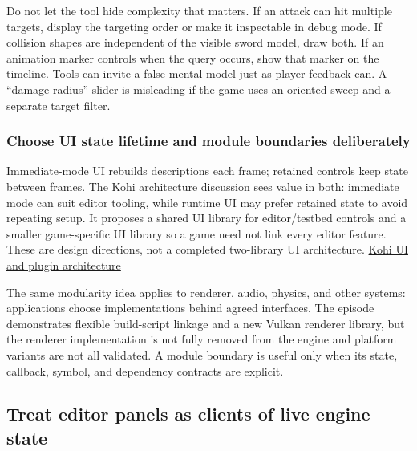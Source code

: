 Do not let the tool hide complexity that matters. If an attack can hit multiple targets, display the targeting order or make it inspectable in debug mode. If collision shapes are independent of the visible sword model, draw both. If an animation marker controls when the query occurs, show that marker on the timeline. Tools can invite a false mental model just as player feedback can. A ``damage radius'' slider is misleading if the game uses an oriented sweep and a separate target filter.

\subsubsection{Choose UI state lifetime and module boundaries deliberately}\label{06-engine-ii-ch032-choose-ui-state-lifetime-and-module-boundaries-deliberately}

\hypertarget{06-engine-ii-ch032-choose-ui-state-lifetime-and-module-boundaries-deliberately}{}

Immediate-mode UI rebuilds descriptions each frame; retained controls keep state between frames. The Kohi architecture discussion sees value in both: immediate mode can suit editor tooling, while runtime UI may prefer retained state to avoid repeating setup. It proposes a shared UI library for editor/testbed controls and a smaller game-specific UI library so a game need not link every editor feature. These are design directions, not a completed two-library UI architecture. \href{https://www.youtube.com/watch?v=6cn8Ip0IJsw}{Kohi UI and plugin architecture}

The same modularity idea applies to renderer, audio, physics, and other systems: applications choose implementations behind agreed interfaces. The episode demonstrates flexible build-script linkage and a new Vulkan renderer library, but the renderer implementation is not fully removed from the engine and platform variants are not all validated. A module boundary is useful only when its state, callback, symbol, and dependency contracts are explicit.

\subsection{Treat editor panels as clients of live engine state}\label{06-engine-ii-ch032-treat-editor-panels-as-clients-of-live-engine-state}

\hypertarget{06-engine-ii-ch032-treat-editor-panels-as-clients-of-live-engine-state}{}

